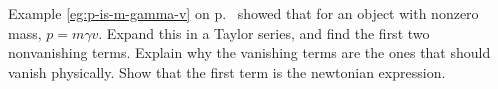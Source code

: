 Example \ref{eg:p-is-m-gamma-v} on p.~\pageref{eg:p-is-m-gamma-v}
showed that for an object with nonzero mass, $p=m\gamma v$.
Expand this in a Taylor series, and find the first two
nonvanishing terms.  Explain why the vanishing terms are the ones that
should vanish physically.  Show that the first term is the newtonian
expression.

